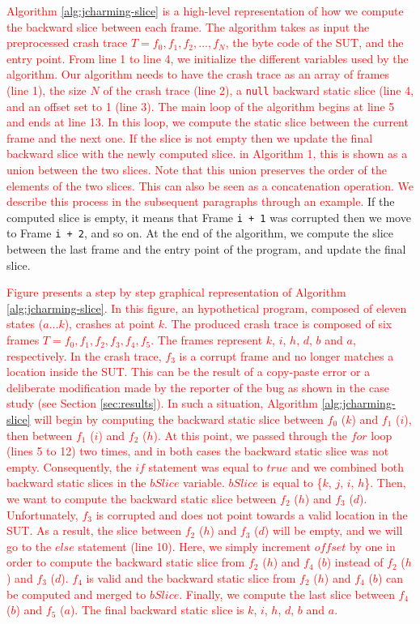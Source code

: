 \documentclass[times, doublespace]{smrauth}
\newcommand{\red}[1]{\textcolor{red}{#1}}
\begin{document}
{\red{Algorithm \ref{alg:jcharming-slice} is a high-level
representation of how we compute the backward slice between
each frame.
The algorithm takes as input the preprocessed
crash trace $T={f_0, f_1, f_2, ..., f_N}$, the byte code of the SUT, and the entry point. From
line 1 to line 4, we initialize the different variables used by the
algorithm.
Our algorithm needs to have the crash trace as an array of frames (line 1), the size $N$ of the crash trace (line 2), a \texttt{null} backward static slice (line 4, and an offset set to 1 (line 3).
The main loop of the algorithm begins at line 5 and
ends at line 13.
In this loop, we compute the static slice
between the current frame and the next one. If the slice is not empty then we update the final backward
slice with the newly computed slice. in Algorithm 1, this is shown as a union between the two slices. Note that this union preserves the order of the elements of the two slices. This can also be seen as a concatenation operation. We describe this process in the subsequent paragraphs through an example.}
If the computed slice is empty, it means that Frame {\tt i + 1}
was corrupted then we move to Frame {\tt i + 2}, and so on.
At the end of the algorithm, we compute the slice between the
last frame and the entry point of the program, and update the
final slice.

\red{Figure \label{fig:jcharming-algo} presents a step by step graphical representation of Algorithm \ref{alg:jcharming-slice}.
In this figure, an hypothetical program, composed of eleven states ($a...k$), crashes at point $k$.
The produced crash trace is composed of six frames $T={f_0, f_1, f_2, f_3, f_4, f_5}$.
The frames represent $k$, $i$, $h$, $d$, $b$ and $a$, respectively.
In the crash trace, $f_3$ is a corrupt frame and no longer matches a location inside the SUT. This can be the result of a copy-paste error or a deliberate modification made by the reporter of the bug as shown in the case study (see Section \ref{sec:results}).
In such a situation, Algorithm \ref{alg:jcharming-slice} will begin by computing the backward static slice between $f_0$ ($k$) and $f_1$ ($i$), then between  $f_1$ ($i$) and $f_2$ ($h$).
At this point, we passed through the $for$ loop (lines 5 to 12) two times, and in both cases the backward static slice was not empty.
Consequently, the $if$ statement was equal to $true$ and we combined both backward static slices in the $bSlice$ variable.
$bSlice$ is equal to \{$k$, $j$, $i$, $h$\}.
Then, we want to compute the backward static slice between $f_2$ ($h$) and $f_3$ ($d$).
Unfortunately, $f_3$ is corrupted and does not point towards a valid location in the SUT.
As a result, the slice between $f_2$ ($h$) and $f_3$ ($d$) will be empty, and we will go to the $else$ statement (line 10).
Here, we simply increment $offset$ by one in order to compute the backward static slice from $f_2$ ($h$) and $f_4$ ($b$) instead of $f_2$ ($h$) and $f_3$ ($d$).
$f_4$ is valid and the backward static slice from $f_2$ ($h$) and $f_4$ ($b$) can be computed and merged to $bSlice$.
Finally, we compute the last slice between $f_4$ ($b$) and $f_5$ ($a$).
The final backward static slice is $k$, $i$, $h$, $d$, $b$ and $a$.}

}
\end{document}
